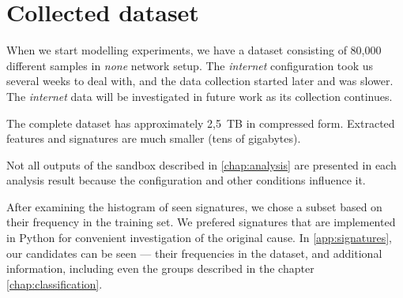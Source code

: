 \section{Collected dataset}
When we start modelling experiments, we have a dataset consisting of 80,000 different samples in \emph{none} network setup. The \emph{internet} configuration took us several weeks to deal with, and the data collection started later and was slower. The \emph{internet} data will be investigated in future work as its collection continues. 

The complete dataset has approximately 2,5~TB in compressed form. Extracted features and signatures are much smaller (tens of gigabytes). 

Not all outputs of the sandbox described in \ref{chap:analysis} are presented in each analysis result because the configuration and other conditions influence it.

After examining the histogram of seen signatures, we chose a subset based on their frequency in the training set. We prefered signatures that are implemented in Python for convenient investigation of the original cause. In \ref{app:signatures}, our candidates can be seen --- their frequencies in the dataset, and additional information, including even the groups described in the chapter \ref{chap:classification}.